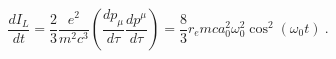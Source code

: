 \begin{equation} \label{ct99-15}
 \frac{dI_L}{dt}=\frac{2}{3}\frac{e^2}{m^2c^3}\left(\frac{dp_{\mu}}{d\tau}\frac{dp^{\mu}}{d\tau}\right)=\frac{8}{3}r_emca_0^2\omega _0^2\cos ^2(\omega _0t)~.
\end{equation}

